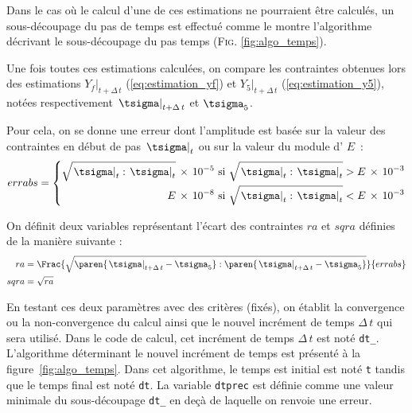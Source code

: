 \documentclass[rectoverso,pleiades,pstricks,leqno,anti]{texmf/note_technique_2010}
\newcommand{\debutpas}[1]{\ensuremath{\left.#1\right|_{t}}}
\newcommand{\finpas}[1]{\ensuremath{\left.#1\right|_{t+\Delta\, t}}}
\begin{document}
Dans le cas où le calcul d'une de ces estimations ne pourraient être
calculés, un sous-découpage du pas de temps est effectué comme le montre
l'algorithme décrivant le sous-découpage du pas temps (\textsc{Fig.}
\ref{fig:algo_temps}).

Une fois toutes ces estimations calculées, on compare les contraintes
obtenues lors des estimations \(\finpas{Y_f}\) (\ref{eq:estimation_yf})
et \(\finpas{Y_5}\) (\ref{eq:estimation_y5}), notées respectivement
\(\finpas{\tsigma}\) et \(\tsigma_5\).

Pour cela, on se donne une erreur dont l'amplitude est basée sur la
valeur des contraintes en début de pas \(\debutpas{\tsigma}\) ou sur la
valeur du module d' \(E\)~:
\[
errabs = \left\{
\begin{aligned}
  \sqrt{\debutpas{\tsigma}:\debutpas{\tsigma}}\,\times\,10^{-5} &\textrm{ si }\sqrt{\debutpas{\tsigma}:\debutpas{\tsigma}}>E\,\times\,10^{-3} \\
  E\,\times\,10^{-8}                       &\textrm{ si }\sqrt{\debutpas{\tsigma}:\debutpas{\tsigma}}<E\,\times\,10^{-3}
\end{aligned}
\right.
\]

On définit deux variables représentant
l'écart des contraintes \(ra\) et \(sqra\) définies de la manière
suivante :
\begin{align}
  ra &=
  \Frac{\sqrt{\paren{\finpas{\tsigma}-\tsigma_5}:\paren{\finpas{\tsigma}-\tsigma_5}}}{errabs}\\
  sqra &= \sqrt{ra}\\
\end{align}

En testant ces deux paramètres avec des critères (fixés), on établit la
convergence ou la non-convergence du calcul ainsi que le nouvel
incrément de temps \(\Delta\, t\) qui sera utilisé. Dans le code de
calcul, cet incrément de temps \(\Delta\, t\) est noté \texttt{dt\_}.
L'algorithme déterminant le nouvel incrément de temps est présenté à la
figure~\ref{fig:algo_temps}. Dans cet algorithme, le temps est initial
est noté \texttt{t} tandis que le temps final est noté \texttt{dt}. La
variable \texttt{dtprec} est définie comme une valeur minimale du
sous-découpage \texttt{dt\_} en deçà de laquelle on renvoie une erreur.
\end{document}
